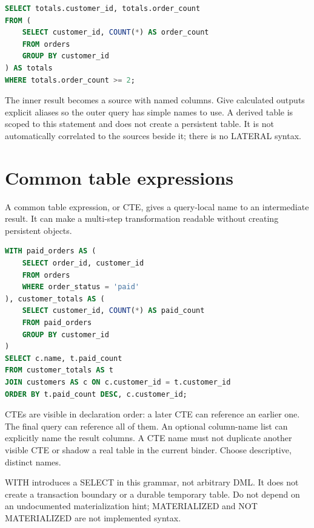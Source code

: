 \begin{lstlisting}[language=SQL]
SELECT totals.customer_id, totals.order_count
FROM (
    SELECT customer_id, COUNT(*) AS order_count
    FROM orders
    GROUP BY customer_id
) AS totals
WHERE totals.order_count >= 2;
\end{lstlisting}

The inner result becomes a source with named columns. Give calculated outputs explicit aliases so the outer query has simple names to use. A derived table is scoped to this statement and does not create a persistent table. It is not automatically correlated to the sources beside it; there is no LATERAL syntax.


\section{Common table expressions}
\label{sql:cte}

A common table expression, or CTE, gives a query-local name to an intermediate result. It can make a multi-step transformation readable without creating persistent objects.

\begin{lstlisting}[language=SQL]
WITH paid_orders AS (
    SELECT order_id, customer_id
    FROM orders
    WHERE order_status = 'paid'
), customer_totals AS (
    SELECT customer_id, COUNT(*) AS paid_count
    FROM paid_orders
    GROUP BY customer_id
)
SELECT c.name, t.paid_count
FROM customer_totals AS t
JOIN customers AS c ON c.customer_id = t.customer_id
ORDER BY t.paid_count DESC, c.customer_id;
\end{lstlisting}

CTEs are visible in declaration order: a later CTE can reference an earlier one. The final query can reference all of them. An optional column-name list can explicitly name the result columns. A CTE name must not duplicate another visible CTE or shadow a real table in the current binder. Choose descriptive, distinct names.

WITH introduces a SELECT in this grammar, not arbitrary DML. It does not create a transaction boundary or a durable temporary table. Do not depend on an undocumented materialization hint; MATERIALIZED and NOT MATERIALIZED are not implemented syntax.

